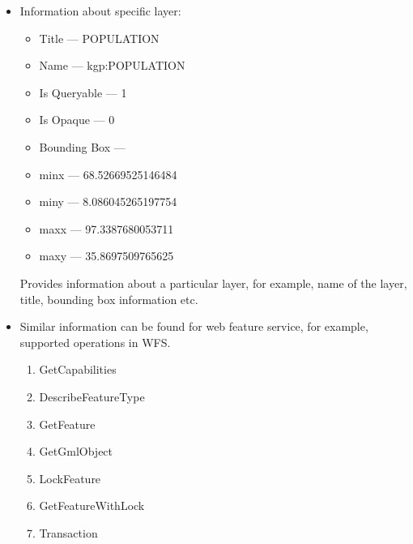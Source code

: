 \begin{itemize}
\item Information about specific layer: 
\begin{itemize}
\item Title --- POPULATION 
\item Name --- kgp:POPULATION 
\item Is Queryable --- 1 
\item Is Opaque --- 0 
\item Bounding Box ---  
\item minx --- 68.52669525146484 
\item miny --- 8.086045265197754 
\item maxx --- 97.3387680053711 
\item maxy --- 35.8697509765625
\end{itemize}
Provides information about a particular layer, for example, name of the layer, title, bounding box information etc.

\item Similar information can be found for web feature service, for example, supported operations in WFS.
\begin{enumerate}
\item GetCapabilities
\item DescribeFeatureType
\item GetFeature
\item GetGmlObject
\item LockFeature
\item GetFeatureWithLock
\item Transaction
\end{enumerate}

\end{itemize}
